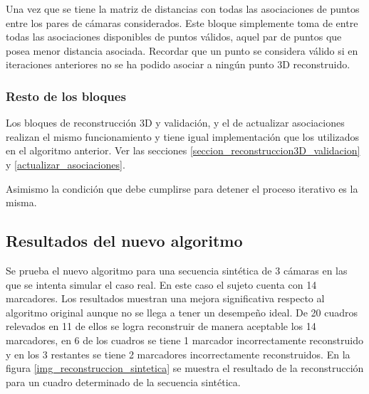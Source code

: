 Una vez que se tiene la matriz de distancias con todas las asociaciones de puntos entre los pares de cámaras considerados. Este bloque simplemente toma de entre todas las asociaciones disponibles de puntos válidos, aquel par de puntos que posea menor distancia asociada.
Recordar que un punto se considera válido si en iteraciones anteriores no se ha podido asociar a ningún punto 3D reconstruido.

\subsubsection{Resto de los bloques}

Los bloques de reconstrucción 3D y validación, y el de actualizar asociaciones realizan el mismo funcionamiento y tiene igual implementación que los utilizados en el algoritmo anterior. Ver las secciones \ref{seccion_reconstruccion3D_validacion} y \ref{actualizar_asociaciones}.

  Asimismo la condición que debe cumplirse para detener el proceso iterativo es la misma.
  
  
\subsection{Resultados del nuevo algoritmo}  
 
Se prueba el nuevo algoritmo para una secuencia sintética de 3 cámaras en las que se intenta simular el caso real. En este caso el sujeto cuenta con 14 marcadores. 
Los resultados muestran una mejora significativa respecto al algoritmo original
aunque no se llega a tener un desempeño ideal. 
De 20 cuadros relevados en 11 de ellos se logra reconstruir de manera aceptable los 14 marcadores, en 6 de los cuadros se tiene 1 marcador incorrectamente reconstruido y en los 3 restantes se tiene 2 marcadores incorrectamente reconstruidos.
En la figura \ref{img_reconstruccion_sintetica} se muestra el resultado de la reconstrucción para un cuadro  determinado de la secuencia sintética.\\

